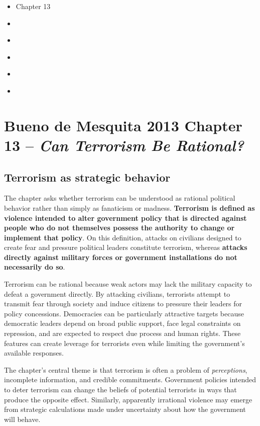 
\begin{itemize}
    \item [***] \textcite{buenodemesquitaPrinciplesInternationalPolitics2013}{Chapter 13}
    \item [***] \textcite{kyddStrategiesTerrorism2006}
    \item \textcite{huffHowPublicDefines2018}
    \item \textcite{papeStrategicLogicSuicide2003}
    \item \textcite{piazzaTransnationalTerrorHuman2009}
    \item \textcite{duganMovingDeterrenceEffectiveness2012}
\end{itemize}

\section{Bueno de Mesquita 2013 Chapter 13 -- \textit{Can Terrorism Be Rational?}}

\subsection{Terrorism as strategic behavior}

The chapter asks whether terrorism can be understood as rational political behavior rather than simply as fanaticism or madness. \textbf{Terrorism is defined as violence intended to alter government policy that is directed against people who do not themselves possess the authority to change or implement that policy}. On this definition, attacks on civilians designed to create fear and pressure political leaders constitute terrorism, whereas \textbf{attacks directly against military forces or government installations do not necessarily do so}.

Terrorism can be rational because weak actors may lack the military capacity to defeat a government directly. By attacking civilians, terrorists attempt to transmit fear through society and induce citizens to pressure their leaders for policy concessions. Democracies can be particularly attractive targets because democratic leaders depend on broad public support, face legal constraints on repression, and are expected to respect due process and human rights. These features can create leverage for terrorists even while limiting the government's available responses.

The chapter's central theme is that terrorism is often a problem of \textit{perceptions}, incomplete information, and credible commitments. Government policies intended to deter terrorism can change the beliefs of potential terrorists in ways that produce the opposite effect. Similarly, apparently irrational violence may emerge from strategic calculations made under uncertainty about how the government will behave.

